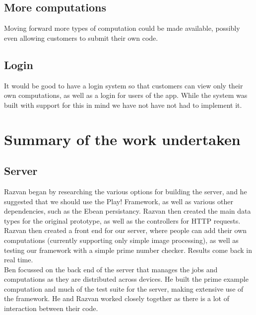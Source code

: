 \documentclass[a4paper,10pt]{article}
\begin{document}
\subsection{More computations}

Moving forward more types of computation could be made available, possibly even allowing customers to submit their own code.




\subsection{Login}

It would be good to have a login system so that customers can view only their own computations,
as well as a login for users of the app.
While the system was built with support for this in mind we have not have not had to implement it.


\section{Summary of the work undertaken}

\subsection{Server}



Razvan began by researching the various options for building the server, and he suggested that we should use the Play! Framework, as well as various other dependencies, such as the Ebean persistancy. Razvan then created the main data types for the original prototype, as well as the controllers for HTTP requests. 
Razvan then created a front end for our server, where people can add their own computations (currently supporting only simple image processing), as well as testing our framework with a simple  prime number checker. Results come back in real time.\\

Ben focussed on the back end of the server that manages the jobs and computations as they are distributed across devices.
He built the prime example computation and much of the test suite for the server, making extensive use of the framework.
He and Razvan worked closely together as there is a lot of interaction between their code.
\end{document}
